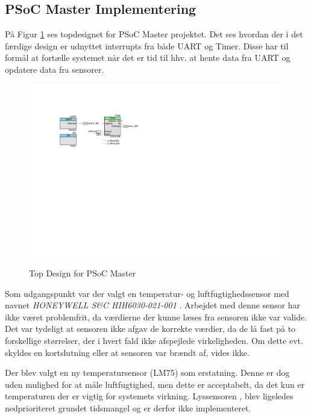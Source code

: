 \subsection{PSoC Master Implementering} \label{ch:master_psoc_impl}

På Figur \ref{fig:psoc_master_topdesign} ses topdesignet for PSoC Master projektet. 
Det ses hvordan der i det færdige design er udnyttet interrupts fra både UART og Timer. 
Disse har til formål at fortælle systemet når det er tid til hhv. at hente data fra UART og opdatere data fra sensorer.

\begin{figure}[h]
\centering
\includegraphics[width=\textwidth*7/10, trim=100 389 480 100, clip=true]{../fig/TopDesign_PSoC_Master}
\caption{Top Design for PSoC Master}
\label{fig:psoc_master_topdesign}
\end{figure}


Som udgangspunkt var der valgt en temperatur- og luftfugtighedssensor med navnet \textit{HONEYWELL S\&C  HIH6030-021-001} \cite{lib:TempHum_DS}. 
Arbejdet med denne sensor har ikke været problemfrit, da værdierne der kunne læses fra sensoren ikke var valide. 
Det var tydeligt at sensoren ikke afgav de korrekte værdier, da de lå fast på to forskellige størrelser, der i hvert fald ikke afspejlede virkeligheden. 
Om dette evt. skyldes en kortslutning eller at sensoren var brændt af, vides ikke.

Der blev valgt en ny temperatursensor (LM75\cite{lib:LM75}) som erstatning. Denne er dog uden mulighed for at måle luftfugtighed, men dette er acceptabelt, da det kun er temperaturen der er vigtig for systemets virkning. 
Lyssensoren \cite{lib:LightSens}, blev ligeledes nedprioriteret grundet tidsmangel og er derfor ikke implementeret.

